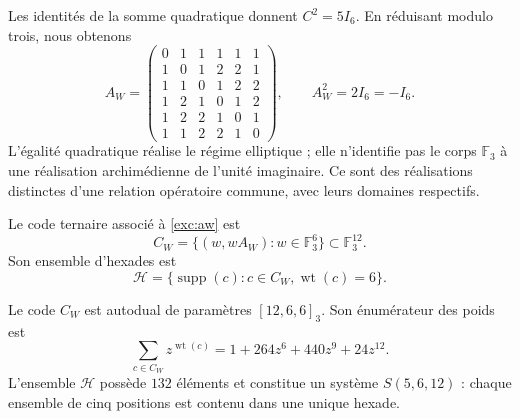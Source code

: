 

Les identités de la somme quadratique donnent $C^2=5I_6$. En réduisant modulo
trois, nous obtenons
\begin{equation}
 A_W=
 \begin{pmatrix}
 0&1&1&1&1&1\\
 1&0&1&2&2&1\\
 1&1&0&1&2&2\\
 1&2&1&0&1&2\\
 1&2&2&1&0&1\\
 1&1&2&2&1&0
 \end{pmatrix},
 \qquad A_W^2=2I_6=-I_6.
 \label{exc:aw}
\end{equation}
L'égalité quadratique réalise le régime elliptique ; elle n'identifie pas le
corps $\mathbb F_3$ à une réalisation archimédienne de l'unité
imaginaire. Ce sont des réalisations distinctes d'une relation opératoire
commune, avec leurs domaines respectifs.



\begin{definition}
\label{exc:codigo}
Le code ternaire associé à \eqref{exc:aw} est
\[
 C_W=\{(w,wA_W):w\in\mathbb F_3^6\}
       \subset\mathbb F_3^{12}.
\]
Son ensemble d'hexades est
\[
 \mathcal H=
 \{\operatorname{supp}(c):c\in C_W,
                           \operatorname{wt}(c)=6\}.
\]
\end{definition}

\begin{proposition}
\label{exc:codigo-witt}
Le code $C_W$ est autodual de paramètres $[12,6,6]_3$. Son énumérateur
des poids est
\begin{equation}
 \sum_{c\in C_W}z^{\operatorname{wt}(c)}
   =1+264z^6+440z^9+24z^{12}.
 \label{exc:enumerador}
\end{equation}
L'ensemble $\mathcal H$ possède $132$ éléments et constitue un système
$S(5,6,12)$ : chaque ensemble de cinq positions est contenu dans une
unique hexade.
\end{proposition}

